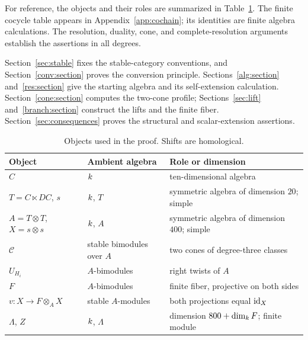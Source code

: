 For reference, the objects and their roles are summarized in
Table~\ref{tab:objects}. The finite cocycle table appears in
Appendix~\ref{app:cochain}; its identities are finite algebra
calculations. The resolution, duality, cone, and complete-resolution
arguments establish the assertions in all degrees.

Section~\ref{sec:stable} fixes the stable-category conventions, and
Section~\ref{conv:section} proves the conversion principle.
Sections~\ref{alg:section} and~\ref{res:section} give the starting
algebra and its self-extension calculation.
Section~\ref{cone:section} computes the two-cone profile;
Sections~\ref{sec:lift} and~\ref{branch:section} construct the lifts and
the finite fiber. Section~\ref{sec:consequences} proves the structural
and scalar-extension assertions.

\begin{table}[ht]
\centering\small
\begin{tabular}{@{}lll@{}}
\toprule
Object & Ambient algebra & Role or dimension\\
\midrule
$C$ & $k$ & ten-dimensional algebra\\
$T=C\ltimes DC$, $s$ & $k$, $T$ & symmetric algebra of dimension $20$; simple\\
$A=T\otimes T$, $X=s\otimes s$ & $k$, $A$ & symmetric algebra of dimension $400$; simple\\
$\mathcal C$ & stable bimodules over $A$ & two cones of degree-three classes\\
$U_{H_i}$ & $A$-bimodules & right twists of $A$\\
$F$ & $A$-bimodules & finite fiber, projective on both sides\\
$v:X\to F\otimes_A X$ & stable $A$-modules & both projections equal $\operatorname{id}_X$\\
$\Lambda$, $Z$ & $k$, $\Lambda$ & dimension $800+\dim_k F$; finite module\\
\bottomrule
\end{tabular}
\caption{Objects used in the proof. Shifts are homological.}
\label{tab:objects}
\end{table}
